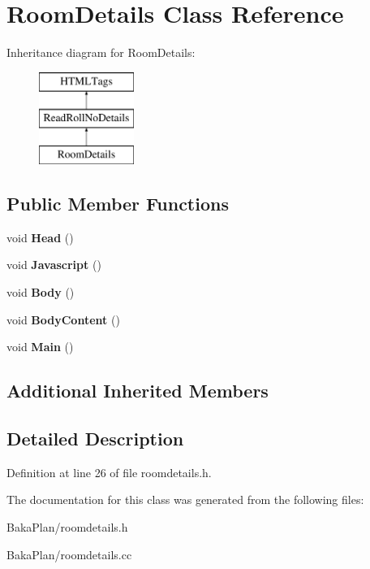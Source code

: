 \hypertarget{classRoomDetails}{\section{Room\-Details Class Reference}
\label{classRoomDetails}
}
Inheritance diagram for Room\-Details\-:\begin{figure}[H]
\begin{center}
\leavevmode
\includegraphics[height=3.000000cm]{classRoomDetails}
\end{center}
\end{figure}
\subsection*{Public Member Functions}
\begin{DoxyCompactItemize}
\item 
\hypertarget{classRoomDetails_a12c87132fd36826fe2af9dbdb0b78e95}{void {\bfseries Head} ()}\label{classRoomDetails_a12c87132fd36826fe2af9dbdb0b78e95}

\item 
\hypertarget{classRoomDetails_aa88baea324517582b52f0e414744ea5d}{void {\bfseries Javascript} ()}\label{classRoomDetails_aa88baea324517582b52f0e414744ea5d}

\item 
\hypertarget{classRoomDetails_ad75c50cee05130e464714649ad640fa5}{void {\bfseries Body} ()}\label{classRoomDetails_ad75c50cee05130e464714649ad640fa5}

\item 
\hypertarget{classRoomDetails_ab440cfe52056a93720c2f6d82622510f}{void {\bfseries Body\-Content} ()}\label{classRoomDetails_ab440cfe52056a93720c2f6d82622510f}

\item 
\hypertarget{classRoomDetails_a5d3f194992c2c13c77d0d07e7d7d5bcd}{void {\bfseries Main} ()}\label{classRoomDetails_a5d3f194992c2c13c77d0d07e7d7d5bcd}

\end{DoxyCompactItemize}
\subsection*{Additional Inherited Members}


\subsection{Detailed Description}


Definition at line 26 of file roomdetails.\-h.



The documentation for this class was generated from the following files\-:\begin{DoxyCompactItemize}
\item 
Baka\-Plan/roomdetails.\-h\item 
Baka\-Plan/roomdetails.\-cc\end{DoxyCompactItemize}
